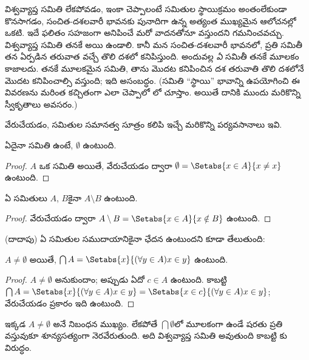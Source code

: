 \documentclass[../../../include/open-logic-section]{subfiles}
\begin{document}
విశ్వవ్యాప్త సమితి లేకపోవడం, ఇంకా చెప్పాలంటే
సమితుల స్థాయిక్రమం
అంతంలేకుండా కొనసాగడం, సంచిత-దశలవారీ
భావనకు పునాదిగా ఉన్న
అత్యంత ముఖ్యమైన ఆలోచనల్లో
ఒకటి. ఇదే ఫలితం సహజంగా
అనిపించే మరో వాదనతోనూ
వస్తుందని గమనించవచ్చు.
విశ్వవ్యాప్త సమితి తనకే
అయి ఉండాలి. కానీ మన
సంచిత-దశలవారీ భావనలో,
ప్రతి సమితీ తన
ఏర్పడిన తరువాత వచ్చే
తొలి దశలో కనిపిస్తుంది.
అందువల్ల \emph{ఏ} సమితీ
తనకే మూలకం కాజాలదు.
తనకే మూలకమైన సమితి,
తాను మొదట కనిపించిన
దశ తరువాతి తొలి దశలోనే
మొదట కనిపించాల్సి వస్తుంది;
ఇది అసంబద్ధం. (సమితి
``స్థాయి'' భావాన్ని ఉపయోగించి
ఈ వివరణను మరింత కచ్చితంగా
ఎలా చెప్పాలో
లో
చూస్తాం. అయితే దానికి
ముందు మరికొన్ని స్వీకృతాలు
అవసరం.)

వేరుచేయడం, సమితుల సమానత్వ
సూత్రం కలిపి ఇచ్చే మరికొన్ని
పర్యవసానాలు ఇవి.

\begin{prop}
ఏదైనా సమితి ఉంటే,
$\emptyset$ ఉంటుంది.
\end{prop}

\begin{proof}
$A$ ఒక సమితి అయితే,
వేరుచేయడం ద్వారా
$\emptyset = \Setabs{x \in A}{x \neq x}$
ఉంటుంది.
\end{proof}

\begin{prop}
ఏ సమితులు $A$, $B$కైనా
$A \setminus B$ ఉంటుంది.
\end{prop}

\begin{proof}
వేరుచేయడం ద్వారా
$A \setminus B = \Setabs{x \in A}{x \notin B}$
ఉంటుంది.
\end{proof}

(దాదాపు) ఏ సమితుల సముదాయానికైనా ఛేదన ఉంటుందని కూడా తేలుతుంది:

\begin{prop}
$A \neq \emptyset$ అయితే,
$\bigcap A = \Setabs{x}{(\forall y \in A)x \in y}$
ఉంటుంది.
\end{prop}

\begin{proof}
$A \neq \emptyset$ అనుకుందాం;
అప్పుడు ఏదో $c \in A$
ఉంటుంది. కాబట్టి
$\bigcap A =
\Setabs{x}{(\forall y \in A)x \in y} = \Setabs{x \in c}{(\forall y \in
A)x \in y}$; వేరుచేయడం
ప్రకారం ఇది ఉంటుంది.
\end{proof}

ఇక్కడ $A \neq \emptyset$ అనే నిబంధన ముఖ్యం.
లేకపోతే $\bigcap
\emptyset$లో మూలకంగా ఉండే షరతు ప్రతి వస్తువుకూ
శూన్యసత్యంగా నెరవేరుతుంది. అది విశ్వవ్యాప్త సమితి
అవుతుంది కాబట్టి కు విరుద్ధం.
\end{document}
